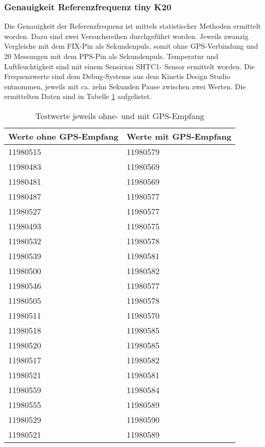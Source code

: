 \subsubsection{Genauigkeit Referenzfrequenz tiny K20}
Die Genauigkeit der Referenzfrequenz ist mittels statistischer Methoden ermittelt worden. Dazu sind zwei Versuchsreihen durchgeführt worden. Jeweils zwanzig Vergleiche mit dem FIX-Pin als Sekundenpuls, somit ohne GPS-Verbindung und 20 Messungen mit dem PPS-Pin als Sekundenpuls. Temperatur und Luftfeuchtigkeit sind mit einem Sensirion SHTC1- Sensor ermittelt worden.
Die Frequenzwerte sind dem Debug-Systems aus dem Kinetis Design Studio entnommen, jeweils mit ca. zehn Sekunden Pause zwischen zwei Werten. Die ermittelten Daten sind in Tabelle \ref{tab:testvalues} aufgelistet.
\begin{table}[H]
	\centering
	\begin{tabular}{|l|l|} \hline
		\textbf{Werte ohne GPS-Empfang}	& \textbf{Werte mit GPS-Empfang} \\ \hline
		11980515						& 11980579 \\ \hline
		11980483						& 11980569 \\ \hline
		11980481						& 11980569 \\ \hline
		11980487						& 11980577 \\ \hline
		11980527						& 11980577 \\ \hline
		11980493						& 11980575 \\ \hline
		11980532						& 11980578 \\ \hline
		11980539						& 11980581 \\ \hline
		11980500						& 11980582 \\ \hline
		11980546						& 11980577 \\ \hline
		11980505						& 11980578 \\ \hline
		11980511						& 11980570 \\ \hline
		11980518						& 11980585 \\ \hline
		11980520						& 11980585 \\ \hline
		11980517						& 11980582 \\ \hline
		11980521						& 11980581 \\ \hline
		11980559						& 11980584 \\ \hline
		11980555						& 11980589 \\ \hline
		11980529						& 11980590 \\ \hline 
		11980521						& 11980589 \\ \hline
	\end{tabular}
	\caption{Testwerte jeweils ohne- und mit GPS-Empfang}
	\label{tab:testvalues}
\end{table}
